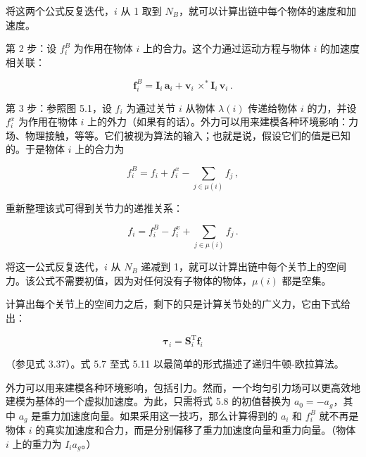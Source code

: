 \documentclass[10pt,a4paper]{book}
\theoremstyle{thmstyle} %
\theoremstyle{defstyle} %
\theoremstyle{prostyle} %
\begin{document}
将这两个公式反复迭代，$i$ 从 1 取到 $N_B$，就可以计算出链中每个物体的速度和加速度。



第 2 步：设 $f_{i}^{B}$ 为作用在物体 $i$ 上的合力。这个力通过运动方程与物体 $i$ 的加速度相关联：



$$
\boldsymbol { f } _ { i } ^{B} = \boldsymbol { I } _ { i } \, \boldsymbol { a } _ { i } + \boldsymbol { v } _ { i } \, \times ^{*} \boldsymbol { I } _ { i } \, \boldsymbol { v } _ { i } \, .
$$



第 3 步：参照图 5.1，设 $f_i$ 为通过关节 $i$ 从物体 $\lambda(i)$ 传递给物体 $i$ 的力，并设 $f_i^x$ 为作用在物体 $i$ 上的外力（如果有的话）。外力可以用来建模各种环境影响：力场、物理接触，等等。它们被视为算法的输入；也就是说，假设它们的值是已知的。于是物体 $i$ 上的合力为



$$
f _ { i } ^{B} = f _ { i } + f _ { i } ^{x} - \sum _ { j \in \mu ( i ) } f _ { j } \, ,
$$



重新整理该式可得到关节力的递推关系：



$$
f _ { i } = f _ { i } ^{B} - f _ { i } ^{x} + \sum _ { j \in \mu ( i ) } f _ { j } \, .
$$



将这一公式反复迭代，$i$ 从 $N_B$ 递减到 1，就可以计算出链中每个关节上的空间力。该公式不需要初值，因为对任何没有子物体的物体，$\mu(i)$ 都是空集。



计算出每个关节上的空间力之后，剩下的只是计算关节处的广义力，它由下式给出：



$$
\boldsymbol { \tau } _ { i } = \boldsymbol { S } _ { i } ^{\mathrm { T} } \boldsymbol { f } _ { i }
$$



（参见式 3.37）。式 5.7 至式 5.11 以最简单的形式描述了递归牛顿-欧拉算法。



外力可以用来建模各种环境影响，包括引力。然而，一个均匀引力场可以更高效地建模为基体的一个虚拟加速度。为此，只需将式 5.8 的初值替换为 $a_{0} = -a_{g}$，其中 $a_{g}$ 是重力加速度向量。如果采用这一技巧，那么计算得到的 $a_{i}$ 和 $f_{i}^{B}$ 就不再是物体 $i$ 的真实加速度和合力，而是分别偏移了重力加速度向量和重力向量。（物体 $i$ 上的重力为 $I_{i}a_{g}$。）
\end{document}
